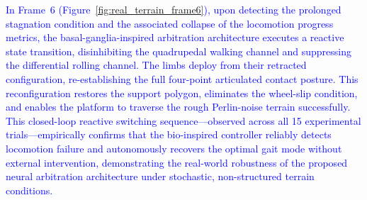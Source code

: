 \documentclass[preprint,12pt]{elsarticle}
\newcommand{\revblue}[1]{\textcolor{blue}{#1}}
\begin{document}
\revblue{In Frame~6 (Figure~}\ref{fig:real_terrain_frame6}\revblue{), upon detecting the prolonged stagnation condition and the associated collapse of the locomotion progress metrics, the basal-ganglia-inspired arbitration architecture executes a reactive state transition, disinhibiting the quadrupedal walking channel and suppressing the differential rolling channel. The limbs deploy from their retracted configuration, re-establishing the full four-point articulated contact posture. This reconfiguration restores the support polygon, eliminates the wheel-slip condition, and enables the platform to traverse the rough Perlin-noise terrain successfully. This closed-loop reactive switching sequence---observed across all 15 experimental trials---empirically confirms that the bio-inspired controller reliably detects locomotion failure and autonomously recovers the optimal gait mode without external intervention, demonstrating the real-world robustness of the proposed neural arbitration architecture under stochastic, non-structured terrain conditions.}
\end{document}
